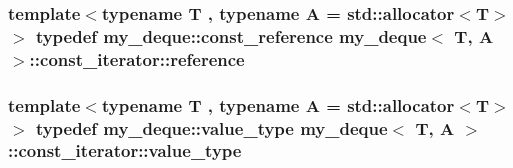 \hypertarget{classmy__deque_1_1const__iterator_a37cd7eef8e73e5a65d7a9d16ba6d3ed2}{
\subsubsection[{reference}]{\setlength{\rightskip}{0pt plus 5cm}template$<$typename T , typename A  = std\-::allocator$<$\-T$>$$>$ typedef {\bf my\-\_\-deque\-::const\-\_\-reference} {\bf my\-\_\-deque}$<$ T, A $>$\-::{\bf const\-\_\-iterator\-::reference}}}\label{classmy__deque_1_1const__iterator_a37cd7eef8e73e5a65d7a9d16ba6d3ed2}
\hypertarget{classmy__deque_1_1const__iterator_adc8d08cb0b0a1dcb50323ba5ab8fdecb}{
\subsubsection[{value\-\_\-type}]{\setlength{\rightskip}{0pt plus 5cm}template$<$typename T , typename A  = std\-::allocator$<$\-T$>$$>$ typedef {\bf my\-\_\-deque\-::value\-\_\-type} {\bf my\-\_\-deque}$<$ T, A $>$\-::{\bf const\-\_\-iterator\-::value\-\_\-type}}}\label{classmy__deque_1_1const__iterator_adc8d08cb0b0a1dcb50323ba5ab8fdecb}


